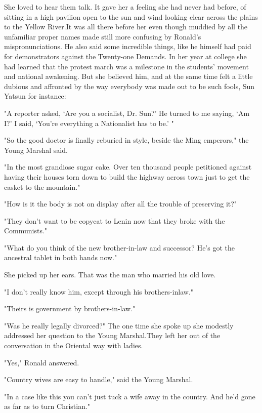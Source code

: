 \par She loved to hear them talk. It gave her a feeling she had never had before, of sitting in a high pavilion open to the sun and wind looking clear across the plains to the Yellow River.It was all there before her even though muddied by all the unfamiliar proper names made still more confusing by Ronald's mispronunciations. He also said some incredible things, like he himself had paid for demonstrators against the Twenty-one Demands. In her year at college she had learned that the protest march was a milestone in the students' movement and national awakening. But she believed him, and at the same time felt a little dubious and affronted by the way everybody was made out to be such fools, Sun Yatsun for instance:
\par "A reporter asked, ‘Are you a socialist, Dr. Sun?' He turned to me saying, ‘Am I?' I said, ‘You're everything a Nationalist has to be.' "
\par "So the good doctor is finally reburied in style, beside the Ming emperors," the Young Marshal said.
\par "In the most grandiose sugar cake. Over ten thousand people petitioned against having their houses torn down to build the highway across town just to get the casket to the mountain."
\par "How is it the body is not on display after all the trouble of preserving it?"
\par "They don't want to be copycat to Lenin now that they broke with the Communists."
\par "What do you think of the new brother-in-law and successor? He's got the ancestral tablet in both hands now."
\par She picked up her ears. That was the man who married his old love.
\par "I don't really know him, except through his brothers-inlaw."
\par "Theirs is government by brothers-in-law."
\par "Was he really legally divorced?" The one time she spoke up she modestly addressed her question to the Young Marshal.They left her out of the conversation in the Oriental way with ladies.
\par "Yes," Ronald answered.
\par "Country wives are easy to handle," said the Young Marshal.
\par "In a case like this you can't just tuck a wife away in the country. And he'd gone as far as to turn Christian."
